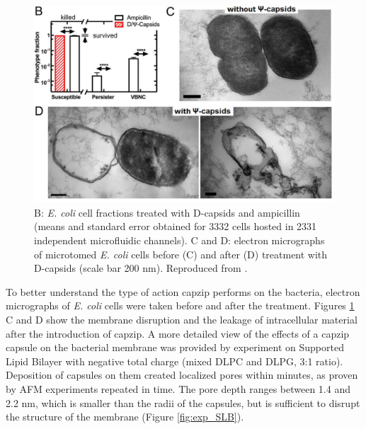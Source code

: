 \begin{figure}
\begin{center}
\includegraphics[width=0.8\linewidth, align = c]{1introduction/pics/ecoli_disruption}
\caption[Effect of capzip on bacterial cells]{B: \emph{E. coli} cell fractions treated with D-capsids and ampicillin (means and standard error obtained for 3332 cells hosted in 2331 independent microfluidic channels). C and D: electron micrographs of microtomed \emph{E. coli} cells before (C) and after (D) treatment with D-capsids (scale bar 200 nm). Reproduced from \citet{Kepiro2019}.} \label{fig:exp_ecoli}
\end{center}
\end{figure}

To better understand the type of action capzip performs on the bacteria, electron micrographs of \emph{E. coli} cells were taken before and after the treatment. Figures \ref{fig:exp_ecoli} C and D show the membrane disruption and the leakage of intracellular material after the introduction of capzip.
%
A more detailed view of the effects of a capzip capsule on the bacterial membrane was provided by experiment on Supported Lipid Bilayer with negative total charge (mixed DLPC and DLPG, 3:1 ratio). Deposition of capsules on them created localized pores within minutes, as proven by AFM experiments repeated in time. The pore depth ranges between 1.4 and 2.2 nm, which is smaller than the radii of the capsules, but is sufficient to disrupt the structure of the membrane (Figure \ref{fig:exp_SLB}).

